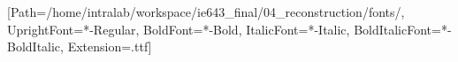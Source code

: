 \setmainfont{Merriweather}[Path=/home/intralab/workspace/ie643_final/04_reconstruction/fonts/, UprightFont=*-Regular, BoldFont=*-Bold, ItalicFont=*-Italic, BoldItalicFont=*-BoldItalic, Extension=.ttf]

\newfontfamily{}

